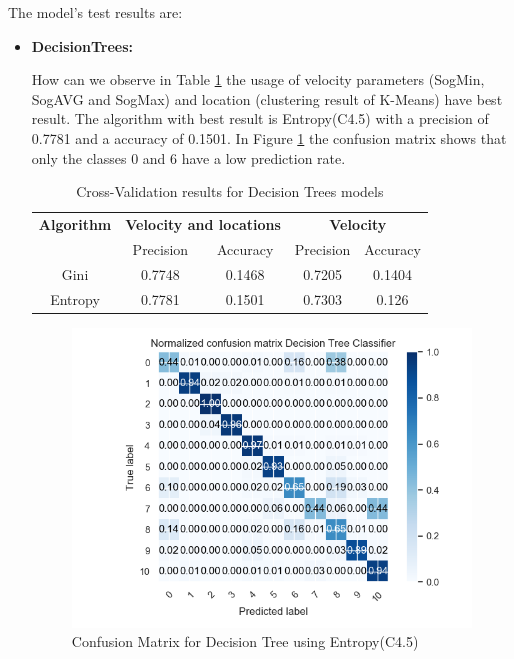 The model's test results are:
\newpage
\begin{itemize}
\item \textbf{ DecisionTrees: }

How can we observe in Table \ref{table:cross_val_decision_trees} the usage of velocity parameters (SogMin, SogAVG and SogMax) and location (clustering result of K-Means) have best result. The algorithm with best result is Entropy(C4.5) with a precision of 0.7781 and a accuracy of 0.1501. In Figure \ref{table:cross_val_decision_trees} the confusion matrix shows that only the classes 0 and 6 have a low prediction rate.


\begin {table}[H]
\begin{center}
\begin{tabular}{c|c|c|c|c}
\multicolumn{1}{c|}{\textbf{Algorithm } }   &\multicolumn{2}{c|}{\textbf{ Velocity and locations}}& \multicolumn{2}{c}{\textbf{ Velocity}}\\
&Precision & Accuracy & Precision & Accuracy \\
\hline
Gini &0.7748&0.1468   &0.7205 &0.1404\\
Entropy   & 0.7781&0.1501   &0.7303 &0.126
\label{table:cross_val_decision_trees}
\end{tabular}
\caption {Cross-Validation results for Decision Trees models}
\end{center}
\end {table}

\begin{figure}[h]
    \centering
    \includegraphics[width=0.8\linewidth]{Chapters/img/CM_DT.png}
    \caption{Confusion Matrix for Decision Tree using Entropy(C4.5)}
    \label{fig:cm_dt}
\end{figure}





\end{itemize}
